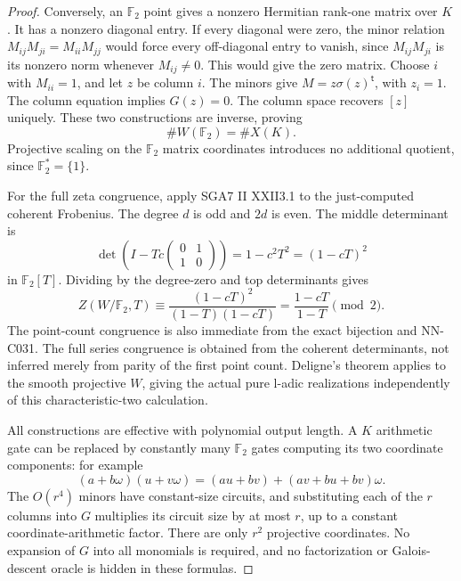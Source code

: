 \begin{proof}
Conversely, an $\mathbb F_2$ point gives a nonzero Hermitian rank-one matrix over $K$. It has a nonzero diagonal entry. If every diagonal were zero, the minor relation
$M_{ij}M_{ji}=M_{ii}M_{jj}$ would force every off-diagonal entry to vanish, since $M_{ij}M_{ji}$ is its nonzero norm whenever $M_{ij}\ne0$. This would give the zero matrix. Choose $i$ with $M_{ii}=1$, and let $z$ be column $i$. The minors give $M=z\sigma(z)^{\mathsf t}$, with $z_i=1$. The column equation implies $G(z)=0$. The column space recovers $[z]$ uniquely. These two constructions are inverse, proving
\[
                             \#W(\mathbb F_2)=\#X(K).
\]
Projective scaling on the $\mathbb F_2$ matrix coordinates introduces no additional quotient, since $\mathbb F_2^*=\{1\}$.

For the full zeta congruence, apply SGA7 II XXII3.1 to the just-computed coherent Frobenius. The degree $d$ is odd and $2d$ is even. The middle determinant is
\[
       \det\left(I-Tc\begin{pmatrix}0&1\\1&0\end{pmatrix}\right)
                      =1-c^2T^2=(1-cT)^2
\]
in $\mathbb F_2[T]$. Dividing by the degree-zero and top determinants gives
\[
     Z(W/\mathbb F_2,T)\equiv
         \frac{(1-cT)^2}{(1-T)(1-cT)}
                   =\frac{1-cT}{1-T}\pmod2.
\]
The point-count congruence is also immediate from the exact bijection and NN-C031. The full series congruence is obtained from the coherent determinants, not inferred merely from parity of the first point count. Deligne's theorem applies to the smooth projective $W$, giving the actual pure l-adic realizations independently of this characteristic-two calculation.

All constructions are effective with polynomial output length. A $K$ arithmetic gate can be replaced by constantly many $\mathbb F_2$ gates computing its two coordinate components: for example
\[
 (a+b\omega)(u+v\omega)
                  =(au+bv)+(av+bu+bv)\omega.
\]
The $O(r^4)$ minors have constant-size circuits, and substituting each of the $r$ columns into $G$ multiplies its circuit size by at most $r$, up to a constant coordinate-arithmetic factor. There are only $r^2$ projective coordinates. No expansion of $G$ into all monomials is required, and no factorization or Galois-descent oracle is hidden in these formulas.


\end{proof}
